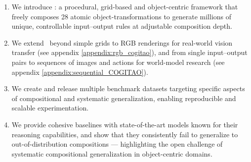 \begin{enumerate}
    \item We introduce \generatorName: a procedural, grid-based and object-centric framework that freely composes 28 atomic object-transformations to generate millions of unique, controllable input–output rules at adjustable composition depth.
    \item We extend \generatorName\ beyond simple grids to RGB renderings for real-world vision transfer (see appendix \ref{appendix:rgb_cogitao}), and from single input–output pairs to sequences of images and actions for world-model research (see appendix \ref{appendix:sequential_COGITAO}).
    \item We create and release multiple benchmark datasets targeting specific aspects of compositional and systematic generalization, enabling reproducible and scalable experimentation.
    \item We provide cohesive baselines with state-of-the-art models known for their reasoning capabilities, and show that they consistently fail to generalize to out-of-distribution compositions --- highlighting the open challenge of systematic compositional generalization in object-centric domains. 
\end{enumerate}
